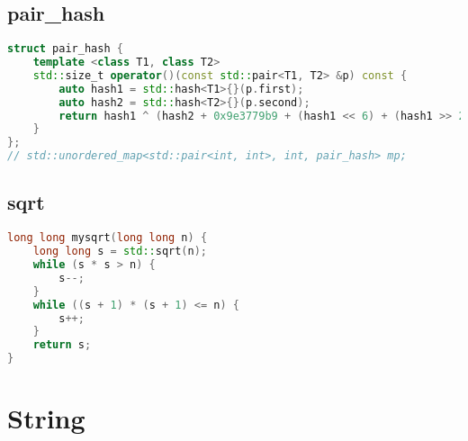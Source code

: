 \subsection{pair\_hash}
\begin{lstlisting}[language=C++]
struct pair_hash {
    template <class T1, class T2>
    std::size_t operator()(const std::pair<T1, T2> &p) const {
        auto hash1 = std::hash<T1>{}(p.first);
        auto hash2 = std::hash<T2>{}(p.second);
        return hash1 ^ (hash2 + 0x9e3779b9 + (hash1 << 6) + (hash1 >> 2));
    }
};
// std::unordered_map<std::pair<int, int>, int, pair_hash> mp;

\end{lstlisting}
\subsection{sqrt}
\begin{lstlisting}[language=C++]
long long mysqrt(long long n) {
    long long s = std::sqrt(n);
    while (s * s > n) {
        s--;
    }
    while ((s + 1) * (s + 1) <= n) {
        s++;
    }
    return s;
}

\end{lstlisting}
\section{String}

